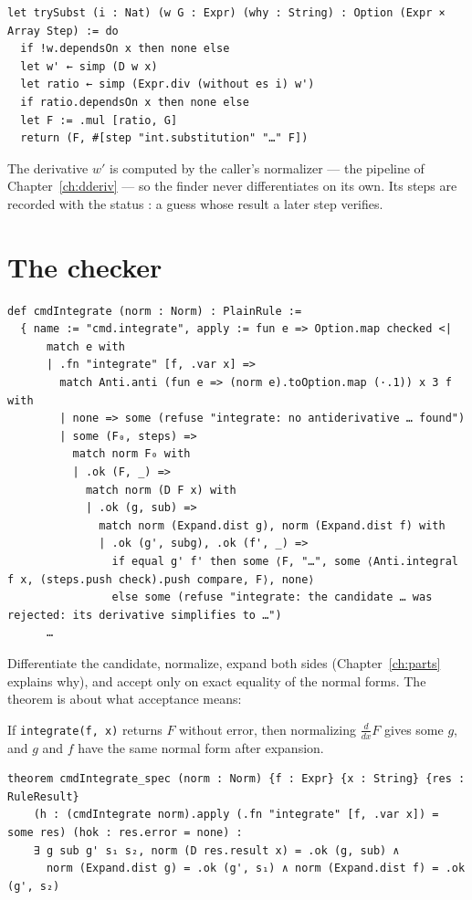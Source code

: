 \begin{verbatim}
let trySubst (i : Nat) (w G : Expr) (why : String) : Option (Expr × Array Step) := do
  if !w.dependsOn x then none else
  let w' ← simp (D w x)
  let ratio ← simp (Expr.div (without es i) w')
  if ratio.dependsOn x then none else
  let F := .mul [ratio, G]
  return (F, #[step "int.substitution" "…" F])
\end{verbatim}

The derivative $w'$ is computed by the caller's normalizer --- the pipeline of
Chapter~\ref{ch:dderiv} --- so the finder never differentiates on its own. Its steps are
recorded with the status : a guess whose result a later step verifies.

\section{The checker}

\begin{verbatim}
def cmdIntegrate (norm : Norm) : PlainRule :=
  { name := "cmd.integrate", apply := fun e => Option.map checked <|
      match e with
      | .fn "integrate" [f, .var x] =>
        match Anti.anti (fun e => (norm e).toOption.map (·.1)) x 3 f with
        | none => some (refuse "integrate: no antiderivative … found")
        | some (F₀, steps) =>
          match norm F₀ with
          | .ok (F, _) =>
            match norm (D F x) with
            | .ok (g, sub) =>
              match norm (Expand.dist g), norm (Expand.dist f) with
              | .ok (g', subg), .ok (f', _) =>
                if equal g' f' then some ⟨F, "…", some ⟨Anti.integral f x, (steps.push check).push compare, F⟩, none⟩
                else some (refuse "integrate: the candidate … was rejected: its derivative simplifies to …")
      …
\end{verbatim}

Differentiate the candidate, normalize, expand both sides (Chapter~\ref{ch:parts} explains
why), and accept only on exact equality of the normal forms. The theorem is about what
acceptance means:

\begin{thmbox}
  If \texttt{integrate(f, x)} returns $F$ without error, then normalizing $\frac{d}{dx} F$ gives
  some $g$, and $g$ and $f$ have the same normal form after expansion.
\end{thmbox}

\begin{verbatim}
theorem cmdIntegrate_spec (norm : Norm) {f : Expr} {x : String} {res : RuleResult}
    (h : (cmdIntegrate norm).apply (.fn "integrate" [f, .var x]) = some res) (hok : res.error = none) :
    ∃ g sub g' s₁ s₂, norm (D res.result x) = .ok (g, sub) ∧
      norm (Expand.dist g) = .ok (g', s₁) ∧ norm (Expand.dist f) = .ok (g', s₂)
\end{verbatim}

